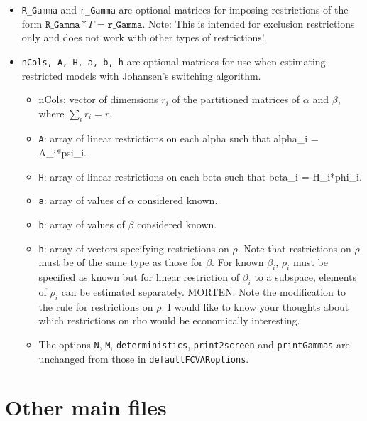 \documentclass[12pt]{article}
\begin{document}
\begin{itemize}

\item \texttt{R\_Gamma} and \texttt{r\_Gamma} are optional matrices for imposing restrictions of the form $\texttt{R\_Gamma} * \Gamma = \texttt{r\_Gamma}$. Note: This is intended for exclusion restrictions only and does not work with other types of restrictions! 

\item \texttt{nCols, A, H, a, b, h} are optional matrices for use when estimating restricted models with Johansen's switching algorithm. 

\begin{itemize}
\item{nCols}: vector of dimensions $r_i$ of the partitioned matrices of $\alpha$ and $\beta$, where $\sum_i r_i = r$. 
\item \texttt{A}: array of linear restrictions on each alpha such that alpha\_i = A\_i*psi\_i. 
\item \texttt{H}: array of linear restrictions on each beta such that beta\_i = H\_i*phi\_i. 
\item \texttt{a}: array of values of $\alpha$ considered known. 
\item \texttt{b}: array of values of $\beta$ considered known. 
\item \texttt{h}: array of vectors specifying restrictions on $\rho$. 
Note that restrictions on $\rho$ must be of the same type as those for $\beta$. For known $\beta_i$, $\rho_i$ must be specified as known but for linear restriction of $\beta_i$ to a subspace, elements of $\rho_i$ can be estimated separately.
MORTEN: Note the modification to the rule for restrictions on $\rho$. I would like to know your thoughts about which restrictions on rho would be economically interesting.

\item The options \texttt{N}, \texttt{M}, \texttt{deterministics}, \texttt{print2screen} and  \texttt{printGammas} are unchanged from those in \texttt{defaultFCVARoptions}.

\end{itemize}

\end{itemize}





\newpage


\section{Other main files}
\end{document}
